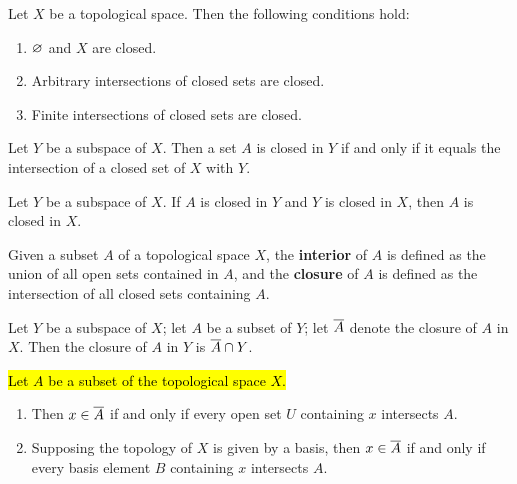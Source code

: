 \vs

\begin{thm}
Let $X$ be a topological space. Then the following conditions hold:
\begin{enumerate}
    \item $\varnothing$ and $X$ are closed.
    \item Arbitrary intersections of closed sets are closed.
    \item Finite intersections of closed sets are closed.
\end{enumerate}
\end{thm}

\vs

\begin{thm}
Let $Y$ be a subspace of $X$. Then a set $A$ is closed in $Y$ if and only if it equals the intersection of a closed set of $X$ with $Y$.
\end{thm}

\vs

\begin{thm}
Let $Y$ be a subspace of $X$. If $A$ is closed in $Y$ and $Y$ is closed in $X$, then $A$ is closed in $X$.
\end{thm}

\vs

\dfn Given a subset $A$ of a topological space $X$, the \textbf{interior} of $A$ is defined as the union of all open sets contained in $A$, and the \textbf{closure} of $A$ is defined as the intersection of all closed sets containing $A$.

\vs

\begin{thm}
Let $Y$ be a subspace of $X$; let $A$ be a subset of $Y$; let $\overline A$ denote the closure of $A$ in $X$. Then the closure of $A$ in $Y$ is $\overline A \cap Y$.
\end{thm}

\vs

\begin{thm}
\hl{Let $A$ be a subset of the topological space $X$.}
\begin{enumerate}
    \item Then $x\in \overline A$ if and only if every open set $U$ containing $x$ intersects $A$.
    \item Supposing the topology of $X$ is given by a basis, then $x\in \overline A$ if and only if every basis element $B$ containing $x$ intersects $A$.
\end{enumerate}
\end{thm}

